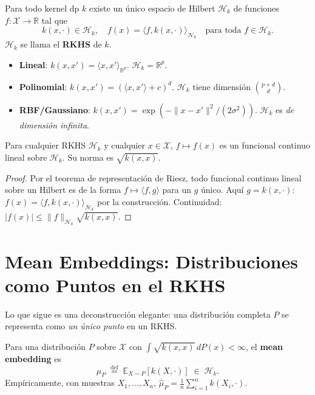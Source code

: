 \begin{theorem}
	\label{thm:moore-aronszajn}
	Para todo kernel dp $k$ existe un único espacio de Hilbert $\mathcal{H}_k$
	de funciones $f : \mathcal{X} \to \mathbb{R}$ tal que
	\[
	k(x, \cdot) \in \mathcal{H}_k, \quad
	f(x) = \langle f, k(x, \cdot)\rangle_{\mathcal{H}_k} \quad\text{para toda }
	f \in \mathcal{H}_k.
	\]
	$\mathcal{H}_k$ se llama el \textbf{RKHS} de $k$.
\end{theorem}

\begin{example}
	\label{ex:kernels}
	\begin{itemize}
		\item \textbf{Lineal}: $k(x,x') = \langle x, x' \rangle_{\mathbb{R}^p}$.
		$\mathcal{H}_k = \mathbb{R}^p$.
		\item \textbf{Polinomial}: $k(x,x') = (\langle x,x'\rangle + c)^d$.
		$\mathcal{H}_k$ tiene dimensión $\binom{p+d}{d}$.
		\item \textbf{RBF/Gaussiano}: $k(x,x') = \exp(-\|x-x'\|^2 /
			(2\sigma^2))$.  $\mathcal{H}_k$ es \emph{de dimensión infinita}.
	\end{itemize}
\end{example}

\begin{proposition}
	Para cualquier RKHS $\mathcal{H}_k$ y cualquier $x \in \mathcal{X}$,
	$f \mapsto f(x)$ es un funcional continuo lineal sobre $\mathcal{H}_k$.
	Su norma es $\sqrt{k(x,x)}$.
\end{proposition}

\begin{proof}
	Por el teorema de representación de Riesz, todo funcional continuo lineal
	sobre un Hilbert es de la forma $f \mapsto \langle f, g\rangle$ para un
	$g$ único.  Aquí $g = k(x,\cdot)$:
	$f(x) = \langle f, k(x,\cdot) \rangle_{\mathcal{H}_k}$ por la construcción.
	Continuidad: $|f(x)| \le \|f\|_{\mathcal{H}_k} \sqrt{k(x,x)}$.
\end{proof}

\section{Mean Embeddings: Distribuciones como Puntos en el RKHS}

Lo que sigue es una deconstrucción elegante: una distribución completa
$P$ se representa como \emph{un único punto} en un RKHS.

\begin{definition}
	\label{def:mean-embed}
	Para una distribución $P$ sobre $\mathcal{X}$ con $\int \sqrt{k(x,x)}\,dP(x) <
	\infty$, el \textbf{mean embedding} es
	\[
	\mu_P \;\stackrel{\text{def}}{=}\; \mathbb{E}_{X \sim P}[k(X, \cdot)]
	\;\in\; \mathcal{H}_k.
	\]
	Empíricamente, con muestras $X_1, \dots, X_n$,
	$\widehat\mu_P = \frac{1}{n}\sum_{i=1}^n k(X_i, \cdot)$.
\end{definition}

